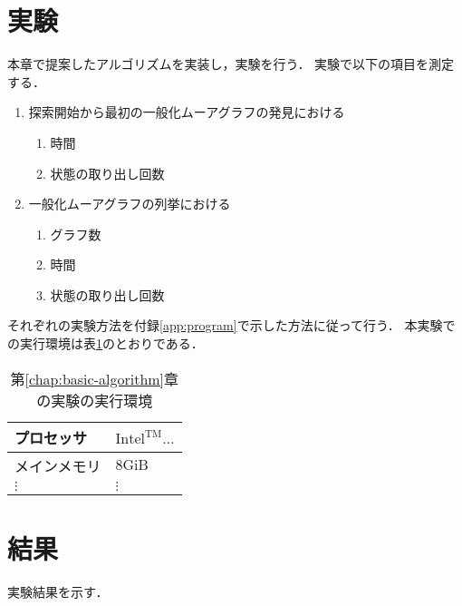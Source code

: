 \section{実験}
\label{sect:exp-basic-algorithm}
本章で提案したアルゴリズムを実装し，実験を行う．
実験で以下の項目を測定する．
\begin{enumerate}
\item 探索開始から最初の一般化ムーアグラフの発見における
  \begin{enumerate}
  \item 時間
  \item 状態の取り出し回数
  \end{enumerate}
\item 一般化ムーアグラフの列挙における
  \begin{enumerate}
  \item グラフ数
  \item 時間
  \item 状態の取り出し回数
  \end{enumerate}
\end{enumerate}
それぞれの実験方法を付録\ref{app:program}で示した方法に従って行う．
本実験での実行環境は表\ref{tab:basic-algorithm-env}のとおりである．
\begin{table}
  \caption{第\ref{chap:basic-algorithm}章の実験の実行環境}
  \label{tab:basic-algorithm-env}
  \centering
  \begin{tabular}{ll}
    \hline
    プロセッサ & $\mathrm{Intel^{TM}\ldots}$ \\ \hline
    メインメモリ & $8\mathrm{GiB}$ \\ \hline
    $\vdots$ & $\vdots$ \\ \hline
  \end{tabular}
\end{table}

\section{結果}
\label{sect:result-basic-algorithm}
実験結果を示す．

